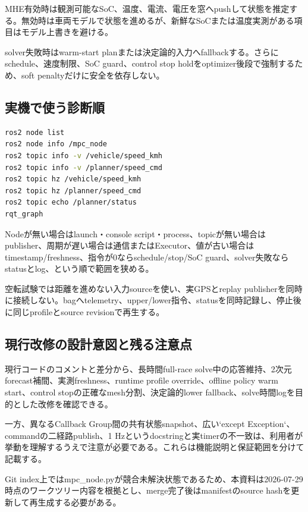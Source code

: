 \documentclass[a4paper,11pt]{article}
\begin{document}
MHE有効時は観測可能なSoC、温度、電流、電圧を窓へpushして状態を推定する。無効時は車両モデルで状態を進めるが、新鮮なSoCまたは温度実測がある項目はモデル上書きを避ける。


solver失敗時はwarm-start planまたは決定論的入力へfallbackする。さらにschedule、速度制限、SoC guard、control stop holdをoptimizer後段で強制するため、soft penaltyだけに安全を依存しない。



\subsection{実機で使う診断順}
\begin{lstlisting}[language=bash]
ros2 node list
ros2 node info /mpc_node
ros2 topic info -v /vehicle/speed_kmh
ros2 topic info -v /planner/speed_cmd
ros2 topic hz /vehicle/speed_kmh
ros2 topic hz /planner/speed_cmd
ros2 topic echo /planner/status
rqt_graph
\end{lstlisting}


Nodeが無い場合はlaunch・console script・process、topicが無い場合はpublisher、周期が遅い場合は通信またはExecutor、値が古い場合はtimestamp/freshness、指令が0ならschedule/stop/SoC guard、solver失敗ならstatusとlog、という順で範囲を狭める。


空転試験では距離を進めない入力sourceを使い、実GPSとreplay publisherを同時に接続しない。bagへtelemetry、upper/lower指令、statusを同時記録し、停止後に同じprofileとsource revisionで再生する。



\subsection{現行改修の設計意図と残る注意点}
現行コードのコメントと差分から、長時間full-race solve中の応答維持、2次元forecast補間、実測freshness、runtime profile override、offline policy warm start、control stopの正確なmesh分割、決定論的lower fallback、solve時間logを目的とした改修を確認できる。


一方、異なるCallback Group間の共有状態snapshot、広い`except Exception`、commandの二経路publish、1 Hzというdocstringと実timerの不一致は、利用者が挙動を理解するうえで注意が必要である。これらは機能説明と保証範囲を分けて記載する。


Git index上ではmpc\_node.pyが競合未解決状態であるため、本資料は2026-07-29時点のワークツリー内容を根拠とし、merge完了後はmanifestのsource hashを更新して再生成する必要がある。
\end{document}
